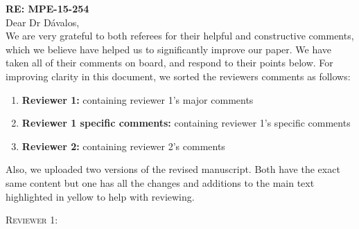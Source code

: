 \documentclass[12pt,letterpaper]{article}
\renewcommand{\section}[1]{%
\bigskip
\begin{center}
\begin{Large}
\normalfont\scshape #1
\medskip
\end{Large}
\end{center}}
\begin{document}

\textbf{RE: MPE-15-254}\\
\bigskip
Dear Dr D\'{a}valos,\\
\bigskip
We are very grateful to both referees for their helpful and constructive comments, which we believe have helped us to significantly improve our paper. We have taken all of their comments on board, and respond to their points below. For improving clarity in this document, we sorted the reviewers comments as follows:
\begin{enumerate}
\item \textbf{Reviewer 1:} containing reviewer 1's major comments
\item \textbf{Reviewer 1 specific comments:} containing reviewer 1's specific comments
\item \textbf{Reviewer 2:} containing reviewer 2's comments
\end{enumerate}
Also, we uploaded two versions of the revised manuscript. Both have the exact same content but one has all the changes and additions to the main text highlighted in yellow to help with reviewing.

\section{Reviewer 1:}
\end{document}
